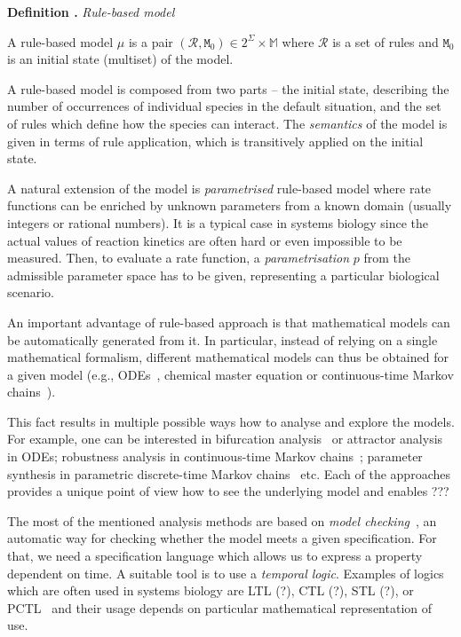 \documentclass[11pt,a4paper]{report}
\newcounter{counter}[section]
\renewcommand{\thecounter}{\thechapter.\arabic{counter}}
\newenvironment{definition}[1]{\bigskip\refstepcounter{counter}\noindent\textbf{Definition \thecounter } \emph{#1} \par\nopagebreak\noindent \begin{itshape}}{\end{itshape}\bigskip}
\begin{document}
\begin{definition}{Rule-based model}
A rule-based model $\mu$ is a pair $(\mathcal{R}, \mathtt{M}_0) \in 2^\Sigma \times \mathbb{M}$ where $\mathcal{R}$ is a set of rules and $\mathtt{M}_0$ is an initial state (multiset) of the model.
\end{definition}

A rule-based model is composed from two parts -- the initial state, describing the number of occurrences of individual species in the default situation, and the set of rules which define how the species can interact. The \emph{semantics} of the model is given in terms of rule application, which is transitively applied on the initial state.

A natural extension of the model is \emph{parametrised} rule-based model where rate functions can be enriched by unknown parameters from a known domain (usually integers or rational numbers). It is a typical case in systems biology since the actual values of reaction kinetics are often hard or even impossible to be measured. Then, to evaluate a rate function, a \emph{parametrisation} $p$ from the admissible parameter space has to be given, representing a particular biological scenario.

An important advantage of rule-based approach is that mathematical models can be automatically generated from it. In particular, instead of relying on a single mathematical formalism, different mathematical models can thus be obtained for a given model (e.g., ODEs~\cite{KaDE}, chemical master equation or continuous-time Markov chains~\cite{Pauleve2010,sneddon2011efficient}).

This fact results in multiple possible ways how to analyse and explore the models. For example, one can be interested in bifurcation analysis~\cite{benevs2017discrete} or attractor analysis~\cite{benevs2018fully} in ODEs; robustness analysis in continuous-time Markov chains~\cite{vceska2014robustness}; parameter synthesis in parametric discrete-time Markov chains~\cite{daws2004symbolic} etc. Each of the approaches provides a unique point of view how to see the underlying model and enables ??? 

The most of the mentioned analysis methods are based on \emph{model checking}~\cite{clarke2018model}, an automatic way for checking whether the model meets a given specification. For that, we need a specification language which allows us to express a property dependent on time. A suitable tool is to use a \emph{temporal logic}. Examples of logics which are often used in systems biology are LTL (?), CTL (?), STL (?), or PCTL~\cite{hasson1994logic} and their usage depends on particular mathematical representation of use.
\end{document}
